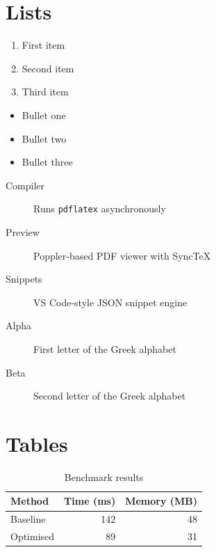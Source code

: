 \documentclass{article}
\begin{document}

\section{Lists}
\label{sec:lists}

\begin{enumerate}
    \item First item
    \item Second item
    \item Third item
\end{enumerate}

\begin{itemize}
    \item Bullet one
    \item Bullet two
    \item Bullet three
\end{itemize}

\begin{description}
    \item[Compiler] Runs \texttt{pdflatex} asynchronously
    \item[Preview] Poppler-based PDF viewer with SyncTeX
    \item[Snippets] VS Code-style JSON snippet engine
\end{description}

\begin{description}
    \item[Alpha] First letter of the Greek alphabet
    \item[Beta] Second letter of the Greek alphabet
\end{description}


\section{Tables}
\label{sec:tables}

\begin{table}[htp]
    \centering
    \caption{Benchmark results}
    \label{tab:data}
    \begin{tabular}{lrr}
        \toprule
        Method    & Time (ms) & Memory (MB) \\
        \midrule
        Baseline  & 142       & 48          \\
        Optimised & 89        & 31          \\
        \bottomrule
    \end{tabular}
\end{table}
\end{document}
